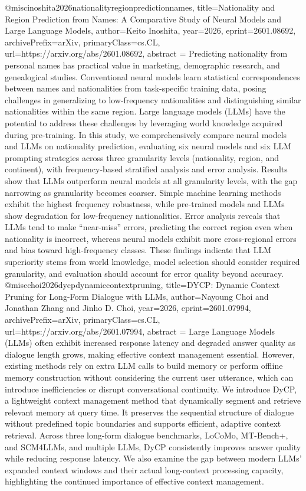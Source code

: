 {}@misc{inoshita2026nationalityregionpredictionnames,
      title={Nationality and Region Prediction from Names: A Comparative Study of Neural Models and Large Language Models}, 
      author={Keito Inoshita},
      year={2026},
      eprint={2601.08692},
      archivePrefix={arXiv},
      primaryClass={cs.CL},
      url={https://arxiv.org/abs/2601.08692},
      abstract = {Predicting nationality from personal names has practical value in marketing, demographic research, and genealogical studies. Conventional neural models learn statistical correspondences between names and nationalities from task-specific training data, posing challenges in generalizing to low-frequency nationalities and distinguishing similar nationalities within the same region. Large language models (LLMs) have the potential to address these challenges by leveraging world knowledge acquired during pre-training. In this study, we comprehensively compare neural models and LLMs on nationality prediction, evaluating six neural models and six LLM prompting strategies across three granularity levels (nationality, region, and continent), with frequency-based stratified analysis and error analysis. Results show that LLMs outperform neural models at all granularity levels, with the gap narrowing as granularity becomes coarser. Simple machine learning methods exhibit the highest frequency robustness, while pre-trained models and LLMs show degradation for low-frequency nationalities. Error analysis reveals that LLMs tend to make ``near-miss'' errors, predicting the correct region even when nationality is incorrect, whereas neural models exhibit more cross-regional errors and bias toward high-frequency classes. These findings indicate that LLM superiority stems from world knowledge, model selection should consider required granularity, and evaluation should account for error quality beyond accuracy.}
}@misc{choi2026dycpdynamiccontextpruning,
      title={DYCP: Dynamic Context Pruning for Long-Form Dialogue with LLMs}, 
      author={Nayoung Choi and Jonathan Zhang and Jinho D. Choi},
      year={2026},
      eprint={2601.07994},
      archivePrefix={arXiv},
      primaryClass={cs.CL},
      url={https://arxiv.org/abs/2601.07994},
      abstract = {Large Language Models (LLMs) often exhibit increased response latency and degraded answer quality as dialogue length grows, making effective context management essential. However, existing methods rely on extra LLM calls to build memory or perform offline memory construction without considering the current user utterance, which can introduce inefficiencies or disrupt conversational continuity. We introduce DyCP, a lightweight context management method that dynamically segment and retrieve relevant memory at query time. It preserves the sequential structure of dialogue without predefined topic boundaries and supports efficient, adaptive context retrieval. Across three long-form dialogue benchmarks, LoCoMo, MT-Bench+, and SCM4LLMs, and multiple LLMs, DyCP consistently improves answer quality while reducing response latency. We also examine the gap between modern LLMs' expanded context windows and their actual long-context processing capacity, highlighting the continued importance of effective context management.}
}
